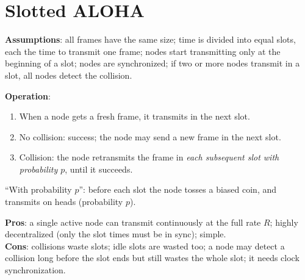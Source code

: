 \section{Slotted ALOHA}

\begin{defn}
\textbf{Assumptions}: all frames have the same size; time is divided into equal slots, each the time to transmit one frame; nodes start transmitting
only at the beginning of a slot; nodes are synchronized; if two or more nodes transmit in a slot, all nodes detect the collision.

\textbf{Operation}:
\begin{enumerate}
  \item When a node gets a fresh frame, it transmits in the next slot.
  \item No collision: success; the node may send a new frame in the next slot.
  \item Collision: the node retransmits the frame in \emph{each subsequent slot with probability $p$}, until it succeeds.
\end{enumerate}
``With probability $p$'': before each slot the node tosses a biased coin, and transmits on heads (probability $p$).
\end{defn}

\begin{center}
\end{center}

\textbf{Pros}: a single active node can transmit continuously at the full rate $R$; highly decentralized (only the slot times must be in sync); simple.\\
\textbf{Cons}: collisions waste slots; idle slots are wasted too; a node may detect a collision long before the slot ends but still wastes the whole slot; it needs clock synchronization.

